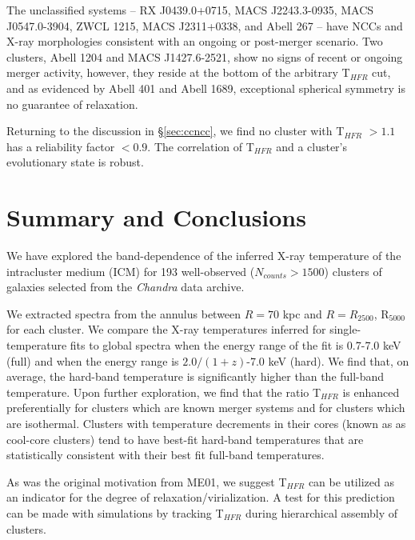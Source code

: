 \documentclass{emulateapj}
\newcommand{\tf}{T$_{HFR}$ }
\newcommand{\chan}{{\textit{Chandra }}}
\begin{document}
The unclassified systems -- RX J0439.0+0715, MACS J2243.3-0935, MACS
J0547.0-3904, ZWCL 1215, MACS J2311+0338, and Abell 267 -- have NCCs and
X-ray morphologies consistent with an ongoing or post-merger
scenario. Two clusters, Abell 1204 and MACS J1427.6-2521, show no
signs of recent or ongoing merger activity, however, they reside at
the bottom of the arbitrary \tf cut, and as evidenced by Abell 401 and
Abell 1689, exceptional spherical symmetry is no guarantee of
relaxation.

Returning to the discussion in \S\ref{sec:ccncc}, we find no cluster
with \tf $> 1.1$ has a reliability factor $< 0.9$. The correlation of
\tf and a cluster's evolutionary state is robust.

\section{Summary and Conclusions}\label{sec:summary}

We have explored the band-dependence of the inferred X-ray temperature
of the intracluster medium (ICM) for 193 well-observed ($N_{counts} >
1500$) clusters of galaxies selected from the \chan data archive.

We extracted spectra from the annulus between $R=70$ kpc and
$R=R_{2500}$, R$_{5000}$ for each cluster. We compare the X-ray
temperatures inferred for single-temperature fits to global spectra
when the energy range of the fit is 0.7-7.0 keV (full) and when the
energy range is $2.0/(1+z)$-7.0 keV (hard). We find that, on
average, the hard-band temperature is significantly higher than
the full-band temperature. Upon further exploration, we find that
the ratio \tf is enhanced preferentially for clusters which are known
merger systems and for clusters which are isothermal. Clusters with
temperature decrements in their cores (known as as cool-core clusters)
tend to have best-fit hard-band temperatures that are statistically
consistent with their best fit full-band temperatures.

As was the original motivation from ME01, we suggest \tf can be
utilized as an indicator for the degree of relaxation/virialization. A
test for this prediction can be made with simulations by tracking \tf
during hierarchical assembly of clusters.
\end{document}
